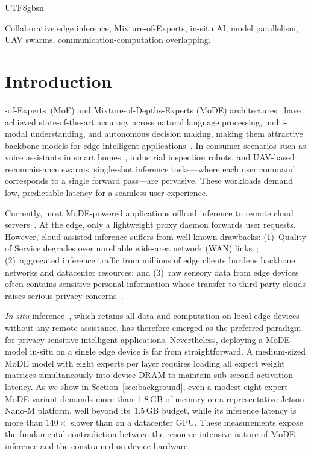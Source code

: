 \documentclass[conference]{IEEEtran}
\begin{document}
\begin{CJK*}{UTF8}{gbsn}
\begin{IEEEkeywords}
Collaborative edge inference, Mixture-of-Experts, in-situ AI,
model parallelism, UAV swarms, communication-computation
overlapping.
\end{IEEEkeywords}

\IEEEpeerreviewmaketitle

\section{Introduction}
\label{sec:intro}

-of-Experts~(MoE) and Mixture-of-Depths-Experts
(MoDE) architectures~\cite{shazeer2017moe,fedus2022switch} have
achieved state-of-the-art accuracy across natural language processing,
multi-modal understanding, and autonomous decision making, making them
attractive backbone models for edge-intelligent
applications~\cite{zhou2019edge}.  In consumer scenarios such as
voice assistants in smart homes~\cite{king2023sasha}, industrial
inspection robots, and UAV-based reconnaissance swarms, single-shot
inference tasks---where each user command corresponds to a single
forward pass---are pervasive.  These workloads demand low, predictable
latency for a seamless user experience.

Currently, most MoDE-powered applications offload inference to remote
cloud servers~\cite{li2023alpaserve,yu2022orca}.  At the edge, only a
lightweight proxy daemon forwards user requests.  However,
cloud-assisted inference suffers from well-known drawbacks: (1)~Quality
of Service degrades over unreliable wide-area network (WAN)
links~\cite{zhou2019edge}; (2)~aggregated inference traffic from millions
of edge clients burdens backbone networks and datacenter resources; and
(3)~raw sensory data from edge devices often contains sensitive personal
information whose transfer to third-party clouds raises serious
privacy concerns~\cite{voigt2017gdpr}.

\emph{In-situ} inference~\cite{zeng2020coedge,jia2022codl}, which
retains all data and computation on local edge devices without any
remote assistance, has therefore emerged as the preferred paradigm for
privacy-sensitive intelligent applications.  Nevertheless, deploying
a MoDE model in-situ on a single edge device is far from
straightforward.  A medium-sized MoDE model with eight experts per
layer requires loading all expert weight matrices simultaneously into
device DRAM to maintain sub-second activation latency.  As we show in
Section~\ref{sec:background}, even a modest eight-expert MoDE variant
demands more than~1.8\,GB of memory on a representative Jetson Nano-M
platform, well beyond its~1.5\,GB budget, while its inference latency
is more than $140\times$ slower than on a datacenter GPU.  These
measurements expose the fundamental contradiction between the
resource-intensive nature of MoDE inference and the constrained
on-device hardware.


\end{CJK*}
\end{document}
